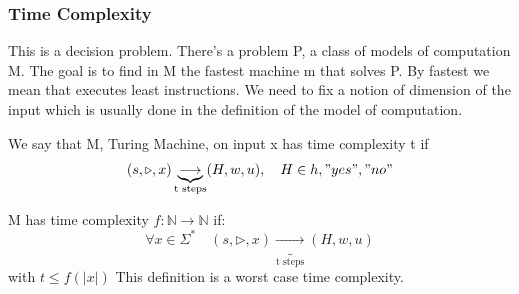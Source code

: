 \subsubsection{Time Complexity}
This is a decision problem. There's a problem P, a class of models of computation M. The goal is to find in M the fastest machine m that solves P. By fastest we mean that executes least instructions. We need to fix a notion of dimension of the input which is usually done in the definition of the model of computation.\\
\begin{definition}
    We say that M, Turing Machine, on input x has time complexity t if 
    \[ 
        (s,\triangleright, x) \underbrace{\longrightarrow}_{\text{t steps}} (H, w, u), \quad H\in {h,"yes","no"}
    \]
\end{definition}
\begin{definition}
    M has time complexity $f: \mathbb{N}\longrightarrow\mathbb{N}$ if:
    \[ 
        \forall x \in \Sigma^*\quad (s,\triangleright, x)\underbrace{\longrightarrow}_{\text{t steps}}(H,w,u) 
    \]
    with $t\leq f(|x|)$
    This definition is a worst case time complexity. 
\end{definition}
